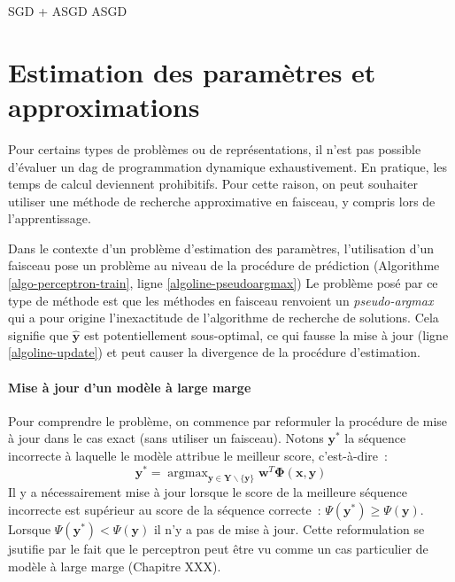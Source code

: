 \documentclass[11pt,openany]{book}
\newcommand{\ac}[1]{{\sc #1}} %
\begin{document}
SGD + ASGD
ASGD

\section{Estimation des paramètres et approximations}

Pour certains types de problèmes ou de représentations, il n'est pas
possible d'évaluer un \ac{dag} de programmation dynamique exhaustivement.
En pratique, les temps de calcul deviennent prohibitifs.
Pour cette raison, on peut souhaiter utiliser une méthode de recherche
approximative en faisceau, y compris lors de l'apprentissage.

Dans le contexte d'un problème d'estimation des paramètres,
l'utilisation d'un faisceau pose un problème au niveau de la procédure
de prédiction (Algorithme  \ref{algo-perceptron-train}, ligne \ref{algoline-pseudoargmax})
Le problème posé par ce type de méthode est que les méthodes en
faisceau renvoient un {\sl pseudo-argmax} qui a pour origine
l'inexactitude de l'algorithme de recherche de solutions.
Cela signifie que $\hat{\mathbf{y}}$ est potentiellement sous-optimal,
ce qui fausse la mise à jour (ligne \ref{algoline-update}) et peut
causer la divergence de la procédure d'estimation.

\paragraph{Mise à jour d'un modèle à large marge}
Pour comprendre le problème, on commence par reformuler la procédure 
de mise à jour dans le cas exact (sans utiliser un faisceau). Notons  $\mathbf{y}^*$ la séquence
incorrecte à laquelle le modèle attribue le meilleur score, c'est-à-dire~:
\begin{displaymath}
\mathbf{y}^* = \mathop{\text{argmax}}_{\mathbf{y} \in
  \mathbf{Y}\backslash \{\mathbf{y}\}} \mathbf{w}^T \boldsymbol\Phi(\mathbf{x},\mathbf{y})
\end{displaymath}
Il y a nécessairement mise à jour lorsque le score de la meilleure séquence
incorrecte est supérieur au score de la séquence correcte~: $\Psi(\mathbf{y}^*) \geq \Psi(\mathbf{y})$.
Lorsque $\Psi(\mathbf{y}^*) <\Psi(\mathbf{y})$ il n'y a pas de mise à
jour. Cette reformulation se jsutifie par le fait que le perceptron
peut être vu comme un cas particulier de modèle à large marge
(Chapitre XXX). 
\end{document}
